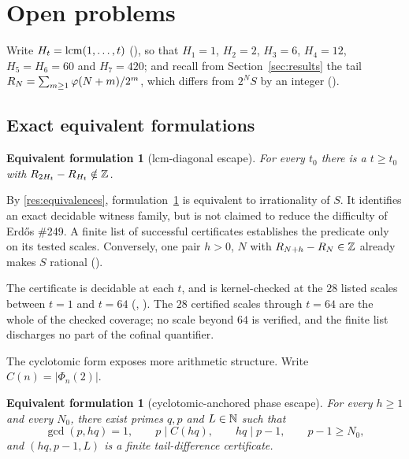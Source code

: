\documentclass[11pt]{article}
\newcommand{\Stot}{S}
\newtheorem{equivform}[theorem]{Equivalent formulation}
\begin{document}
\section{Open problems}\label{sec:frontier}

Write $H_t=\operatorname{lcm}(1,\dots,t)$
(),
so that $H_1=1$, $H_2=2$, $H_3=6$, $H_4=12$, $H_5=H_6=60$ and $H_7=420$; and
recall from Section~\ref{sec:results} the tail
$R_N=\sum_{m\ge1}\varphi(N+m)/2^{m}$, which differs from $2^N\Stot$ by an integer
().

\subsection{Exact equivalent formulations}

\begin{equivform}[lcm-diagonal escape]\label{prob:diagonal}
For every $t_0$ there is a $t\ge t_0$ with $R_{2H_t}-R_{H_t}\notin\mathbb{Z}$.
\end{equivform}

\noindent By \ref{res:equivalences}, formulation~\ref{prob:diagonal} is
equivalent to irrationality of $\Stot$.  It identifies an exact decidable
witness family, but is not claimed to reduce the difficulty of Erd\H{o}s
\#249.  A finite list of successful certificates establishes the predicate
only on its tested scales.  Conversely, one pair $h>0$, $N$ with
$R_{N+h}-R_N\in\mathbb{Z}$ already makes $\Stot$ rational
().

The certificate is decidable at each $t$, and is kernel-checked at the $28$
listed scales between $t=1$ and $t=64$
(,
).
The $28$ certified scales through $t=64$ are the whole of the checked
coverage; no scale beyond $64$ is verified, and the finite list discharges no
part of the cofinal quantifier.

The cyclotomic form exposes more arithmetic structure.  Write
$C(n)=|\Phi_n(2)|$.

\begin{equivform}[cyclotomic-anchored phase escape]\label{prob:cyclotomic}
For every $h\ge1$ and every $N_0$, there exist primes $q,p$ and $L\in\mathbb{N}$ such
that
\[
 \gcd(p,hq)=1,\qquad p\mid C(hq),\qquad hq\mid p-1,
 \qquad p-1\ge N_0,
\]
and $(hq,p-1,L)$ is a finite tail-difference certificate.
\end{equivform}
\end{document}
